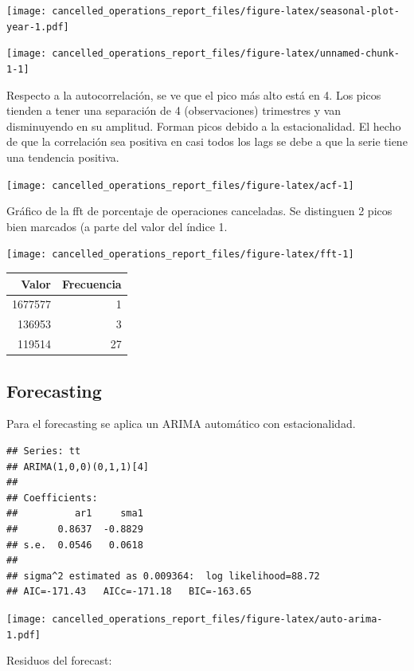 \documentclass[
]{article}
\begin{document}
\texttt{[image: cancelled\_operations\_report\_files/figure-latex/seasonal-plot-year-1.pdf]}

\begin{center}\texttt{[image: cancelled\_operations\_report\_files/figure-latex/unnamed-chunk-1-1]} \end{center}

Respecto a la autocorrelación, se ve que el pico más alto está en 4. Los
picos tienden a tener una separación de 4 (observaciones) trimestres y
van disminuyendo en su amplitud. Forman picos debido a la
estacionalidad. El hecho de que la correlación sea positiva en casi
todos los lags se debe a que la serie tiene una tendencia positiva.

\begin{center}\texttt{[image: cancelled\_operations\_report\_files/figure-latex/acf-1]} \end{center}

Gráfico de la fft de porcentaje de operaciones canceladas. Se distinguen
2 picos bien marcados (a parte del valor del índice 1.

\begin{center}\texttt{[image: cancelled\_operations\_report\_files/figure-latex/fft-1]} \end{center}

\begin{longtable}[]{@{}rr@{}}
\toprule
Valor & Frecuencia\tabularnewline
\midrule
\endhead
1677577 & 1\tabularnewline
136953 & 3\tabularnewline
119514 & 27\tabularnewline
\bottomrule
\end{longtable}

\hypertarget{forecasting}{%
\subsection{Forecasting}\label{forecasting}}

Para el forecasting se aplica un ARIMA automático con estacionalidad.

\begin{verbatim}
## Series: tt 
## ARIMA(1,0,0)(0,1,1)[4] 
## 
## Coefficients:
##          ar1     sma1
##       0.8637  -0.8829
## s.e.  0.0546   0.0618
## 
## sigma^2 estimated as 0.009364:  log likelihood=88.72
## AIC=-171.43   AICc=-171.18   BIC=-163.65
\end{verbatim}

\texttt{[image: cancelled\_operations\_report\_files/figure-latex/auto-arima-1.pdf]}

Residuos del forecast:
\end{document}
